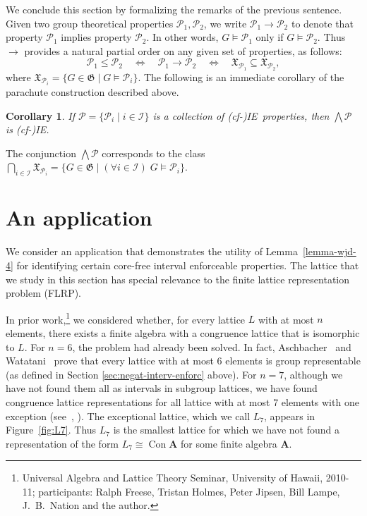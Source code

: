\documentclass{gen-j-l}
\newcommand{\<}{\ensuremath{\langle}}
\renewcommand{\>}{\ensuremath{\rangle}}
\theoremstyle{plain}
\newtheorem{corollary}[theorem]{Corollary}
\theoremstyle{definition}
\theoremstyle{remark}
\numberwithin{theorem}{section}
\numberwithin{claim}{section}
\numberwithin{equation}{section}
\numberwithin{conjecture}{section}
\renewcommand{\leq}{\ensuremath{\leqslant}}
\newcommand{\Meet}{\ensuremath{\bigwedge}}
\newcommand{\Con}{\ensuremath{\operatorname{Con}}}
\newcommand{\2}{\ensuremath{\mathbf{2}}}
\newcommand{\3}{\ensuremath{\mathbf{3}}}
\newcommand{\bA}{\ensuremath{\mathbf{A}}}
\newcommand{\sG}{\ensuremath{\mathfrak{X}}}
\newcommand{\G}{\ensuremath{\mathfrak{G}}}
\newcommand{\sI}{\ensuremath{\mathscr{I}}}
\newcommand{\sP}{\ensuremath{\mathscr{P}}}
\newcommand{\cP}{\ensuremath{\mathcal{P}}}
\newcommand{\IE}{{\small IE}}
\begin{document}
We conclude this section by formalizing the remarks of the previous sentence.
Given two group theoretical properties $\cP_1, \cP_2$, we write
$\cP_1 \rightarrow \cP_2$ to denote that property 
$\cP_1$ implies property $\cP_2$. In other words,
$G\vDash \cP_1$ only if $G\vDash \cP_2$.
Thus $\rightarrow$ provides a natural partial order on any given set of 
properties, as follows:
\[
\cP_1 \leq \cP_2\quad  \Longleftrightarrow \quad \cP_1 \rightarrow \cP_2 \quad
\Longleftrightarrow \quad \sG_{\cP_1}\subseteq
\sG_{\cP_2},
\]
where $\sG_{\cP_i} = \{G\in \G \mid G\vDash \cP_i\}$.
The following is an immediate corollary of the parachute construction
described above.
\begin{corollary}
\label{cor:isle-prop-groups-1}
  If $\sP = \{\cP_i \mid i\in \sI\}$ is a collection of (cf-)\IE\ properties,
  then $\Meet \sP$ is (cf-)\IE.
\end{corollary}
The conjunction $\Meet \sP$ corresponds to the class 
$\bigcap_{i\in \sI} \sG_{\cP_i} = \{G \in \G \mid (\forall i \in \sI) \; G\vDash
\cP_i \}$.

\section{An application}
\label{sec:application}
We consider an application that 
demonstrates the utility of Lemma~\ref{lemma-wjd-4} for identifying certain core-free
interval enforceable properties.
The lattice that we study in this section 
has special relevance to the finite lattice representation problem (\acs{FLRP}).

In prior 
work,\footnote{Universal Algebra and Lattice Theory Seminar, University of
  Hawaii, 2010-11; participants: Ralph Freese, Tristan
  Holmes, Peter Jipsen, Bill Lampe, J.~B.~Nation and the author.}
 we considered whether, for every
lattice $L$ with at most $n$ elements, there exists a finite algebra with a
congruence lattice that is isomorphic to $L$.
For $n=6$, the problem had already been solved.
In fact, Aschbacher~\cite{Aschbacher:2008} and Watatani~\cite{Watatani:1996}
prove that every lattice with at most 6 elements is group representable
(as defined in Section \ref{sec:negat-interv-enforc} above).  
For $n=7$, although we have not found them all as intervals in subgroup lattices, we have
found congruence lattice representations for all lattice with at most 7 elements
with one exception (see~\cite{overalgebras}, \cite{DeMeo:thesis}). 
The exceptional lattice, which we call $L_7$, appears in
Figure~\ref{fig:L7}. Thus $L_7$ is the smallest lattice for which we have not
found a representation of the form $L_7\cong \Con\bA$ for some finite algebra
$\bA$.
\end{document}
